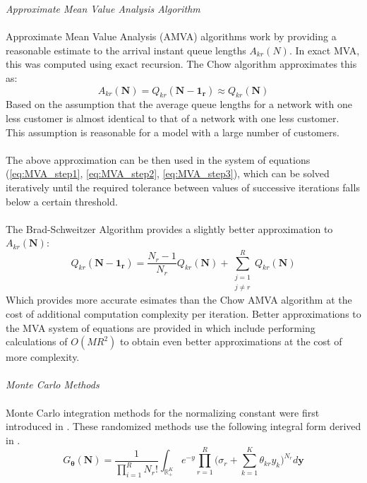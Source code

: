 \textit{{\large Approximate Mean Value Analysis Algorithm}}\\\\
Approximate Mean Value Analysis (AMVA) algorithms work by providing a reasonable estimate to the arrival instant queue lengths \(A_{kr}(N)\). In exact MVA, this was computed using exact recursion. The Chow algorithm \cite{Chow1983ApproximationsNetworks} approximates this as:
\[A_{kr}(\mathbf{N}) = Q_{kr}(\mathbf{N-1_r}) \approx Q_{kr}(\mathbf{N}) \]
Based on the assumption that the average queue lengths for a network with one less customer is almost identical to that of a network with one less customer. This assumption is reasonable for a model with a large number of customers.
\\\\
The above approximation can be then used in the system of equations (\ref{eq:MVA_step1}, \ref{eq:MVA_step2}, \ref{eq:MVA_step3}), which can be solved iteratively until the required tolerance between values of successive iterations falls below a certain threshold.
\\\\
The Brad-Schweitzer Algorithm \cite{Schweitzer1993AQueues} provides a slightly better approximation to \(A_{kr}(\mathbf{N})\):
\[Q_{kr}(\mathbf{N-1_r}) = \frac{N_r-1}{N_r} Q_{kr}(\mathbf{N}) + \sum_{\substack{j=1\\ j\neq r}}^R Q_{kr}(\mathbf{N})\]
Which provides more accurate esimates than the Chow AMVA algorithm at the cost of additional computation complexity per iteration. Better approximations to the MVA system of equations are provided in \cite{Chandy1982Linearizer:Systems} which include performing calculations of \(O(MR^2)\) to obtain even better approximations at the cost of more complexity.
\\\\
\textit{{\large Monte Carlo Methods}}\\\\ 
Monte Carlo integration methods for the normalizing constant were first introduced in \cite{Ross1994MonteNetworks}. These randomized methods use the following integral form derived in \cite{McKenna1984AsymptoticNetworks}. 
\begin{equation}\label{eq:MCI_form_Ross}
    G_{\boldsymbol{\theta}}(\mathbf{N}) = \frac{1}{\prod_{i=1}^R N_r!} \int_{\mathbb{R}_+^K} e^{-y} \prod_{r=1}^R \bigg( \sigma_r + \sum_{k=1}^K \theta_{kr} y_k \bigg)^{N_r} d \mathbf{y}
\end{equation}

